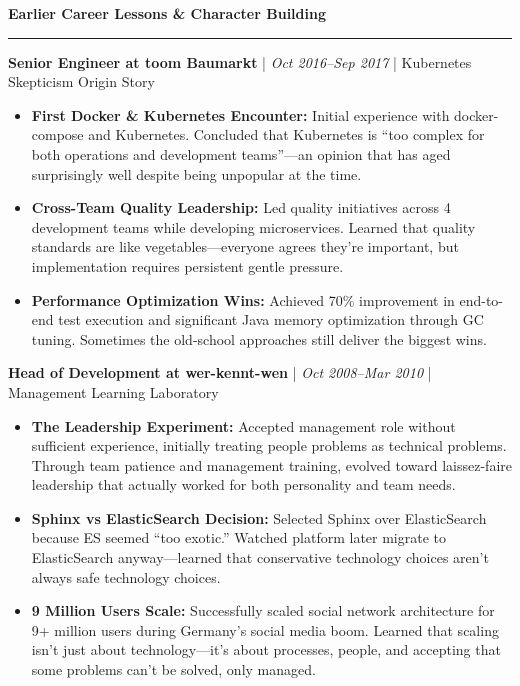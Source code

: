 \documentclass[11pt,a4paper]{article}
\newcommand{\sectionheader}[1]{
    \vspace{0.4em}
    {\Large \textbf{\textsf{\textcolor{primarycolor}{#1}}}}
    \vspace{0.2em}
    \hrule
    \vspace{0.3em}
}
\newcommand{\jobheader}[3]{
    \vspace{0.2em}
    \textbf{#1} | \textit{#2} | #3
    \vspace{0.1em}
}
\begin{document}
\vfill

\newpage

\sectionheader{Earlier Career Lessons \& Character Building}

\jobheader{Senior Engineer at toom Baumarkt}{Oct 2016--Sep 2017}{Kubernetes Skepticism Origin Story}

\begin{itemize}[leftmargin=1em,topsep=0pt,itemsep=0.2em]
\item \textbf{First Docker \& Kubernetes Encounter:} Initial experience with docker-compose and Kubernetes. Concluded that Kubernetes is ``too complex for both operations and development teams''---an opinion that has aged surprisingly well despite being unpopular at the time.
\item \textbf{Cross-Team Quality Leadership:} Led quality initiatives across 4 development teams while developing microservices. Learned that quality standards are like vegetables---everyone agrees they're important, but implementation requires persistent gentle pressure.
\item \textbf{Performance Optimization Wins:} Achieved 70\% improvement in end-to-end test execution and significant Java memory optimization through GC tuning. Sometimes the old-school approaches still deliver the biggest wins.
\end{itemize}

\jobheader{Head of Development at wer-kennt-wen}{Oct 2008--Mar 2010}{Management Learning Laboratory}

\begin{itemize}[leftmargin=1em,topsep=0pt,itemsep=0.2em]
\item \textbf{The Leadership Experiment:} Accepted management role without sufficient experience, initially treating people problems as technical problems. Through team patience and management training, evolved toward laissez-faire leadership that actually worked for both personality and team needs.
\item \textbf{Sphinx vs ElasticSearch Decision:} Selected Sphinx over ElasticSearch because ES seemed ``too exotic.'' Watched platform later migrate to ElasticSearch anyway---learned that conservative technology choices aren't always safe technology choices.
\item \textbf{9 Million Users Scale:} Successfully scaled social network architecture for 9+ million users during Germany's social media boom. Learned that scaling isn't just about technology---it's about processes, people, and accepting that some problems can't be solved, only managed.
\end{itemize}
\end{document}
